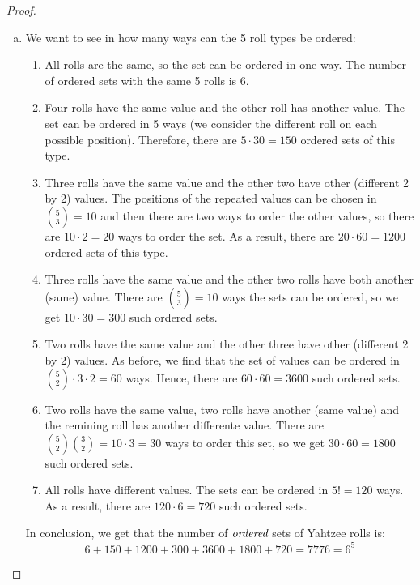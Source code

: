 \begin{proof}
\begin{enumerate}[(a)]
    \item We want to see in how many ways can the 5 roll types be ordered:
        \begin{enumerate}[(1)]
            \item All rolls are the same, so the set can be ordered in one way. The number of 
                ordered sets with the same 5 rolls is 6.

            \item Four rolls have the same value and the other roll has another value.
                The set can be ordered in 5 ways (we consider the different roll on each
                possible position). Therefore, there are $5 \cdot 30 = 150$ ordered sets of this type.

            \item Three rolls have the same value and the other two have other (different 2 by 2) values.
                The positions of the repeated values can be chosen in $\binom{5}{3} = 10$ and then there 
                are two ways to order the other values, so there are $10 \cdot 2 = 20$ ways to order the set.
                As a result, there are $20 \cdot 60 = 1200$ ordered sets of this type.

            \item Three rolls have the same value and the other two rolls have both another (same) value.
                There are $\binom{5}{3} = 10$ ways the sets can be ordered, so we get $10 \cdot 30 = 300$
                such ordered sets.

            \item Two rolls have the same value and the other three have other (different 2 by 2) values.
                As before, we find that the set of values can be ordered in 
                $\binom{5}{2} \cdot 3 \cdot 2 = 60$ ways.
                Hence, there are $60 \cdot 60 = 3600$ such ordered sets.

            \item Two rolls have the same value, two rolls have another (same value) and the 
                remining roll has another differente value. There are 
                $\binom{5}{2}\binom{3}{2} = 10 \cdot 3 = 30$ ways to order this set, so we get 
                $30 \cdot 60 = 1800$ such ordered sets.

            \item All rolls have different values. The sets can be ordered in $5! = 120$ ways. As a result,
                there are $120 \cdot 6 = 720$ such ordered sets.
        \end{enumerate}

        In conclusion, we get that the number of $\emph{ordered}$ sets of Yahtzee rolls is:
        \[
            6 + 150 + 1200 + 300 + 3600 + 1800 + 720 = 7776 = 6^5
        \] 
    \end{enumerate}
\end{proof}

